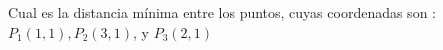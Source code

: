 \begin{frame}

Cual es la distancia mínima entre los puntos, cuyas coordenadas son : $P_1(1,1), P_2(3,1)$, y $P_3(2,1)$

\end{frame}

